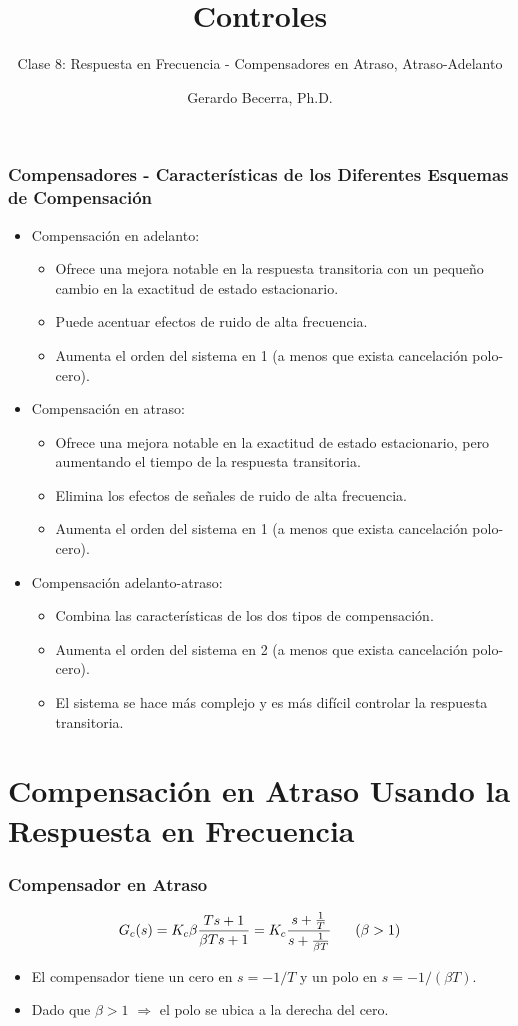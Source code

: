 \documentclass[aspectratio=169,handout]{beamer}
\title{Controles}
\subtitle{\small Clase 8: Respuesta en Frecuencia - Compensadores en Atraso, Atraso-Adelanto}
\author{Gerardo Becerra, Ph.D.}
\institute{Pontificia Universidad Javeriana\\ Departamento de Electrónica}
\date{}
\theoremstyle{definition}
\theoremstyle{plain}
\theoremstyle{remark}
\begin{document}
\frame{\titlepage}	

\begin{frame}[<+->]\frametitle{Compensadores - Características de los Diferentes Esquemas de Compensación}
 	\begin{itemize}
 		\item Compensación en adelanto:
 		\begin{itemize} 
 			\item Ofrece una mejora notable en la respuesta transitoria con un pequeño cambio en la exactitud de estado estacionario.
 			\item Puede acentuar efectos de ruido de alta frecuencia.
 			\item Aumenta el orden del sistema en 1 (a menos que exista cancelación polo-cero).
 		\end{itemize}
 		\item Compensación en atraso:
 		\begin{itemize}
 			\item Ofrece una mejora notable en la exactitud de estado estacionario, pero aumentando el tiempo de la respuesta transitoria.
 			\item Elimina los efectos de señales de ruido de alta frecuencia.
 			\item Aumenta el orden del sistema en 1 (a menos que exista cancelación polo-cero).
 		\end{itemize}
 		\item Compensación adelanto-atraso:
 		\begin{itemize}
 			\item Combina las características de los dos tipos de compensación.
 			\item Aumenta el orden del sistema en 2 (a menos que exista cancelación polo-cero).
 			\item El sistema se hace más complejo y es más difícil controlar la respuesta transitoria.
 		\end{itemize}
  \end{itemize}    
\end{frame}

\section{Compensación en Atraso Usando la Respuesta en Frecuencia}
\begin{frame}[<+->]\frametitle{Compensador en Atraso}
	\begin{equation*}
		G_c(s) = K_c \beta \frac{T s + 1}{\beta T s + 1} = K_c \frac{s+\frac{1}{T}}{s + \frac{1}{\beta T}}\hspace*{6mm} (\beta > 1)
	\end{equation*}
	\pause
	\begin{itemize}
		\item El compensador tiene un cero en $s = -1/T$ y un polo en $s = -1/(\beta T)$.
		\item Dado que $\beta > 1$ $\Rightarrow$ el polo se ubica a la derecha del cero.
	\end{itemize}
\end{frame}
\end{document}
